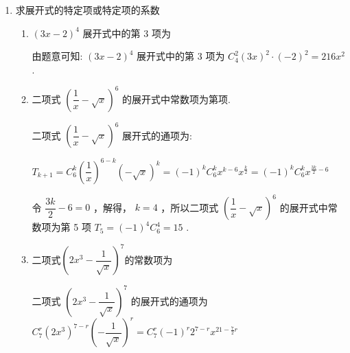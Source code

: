 \begin{enumerate}
\begin{enumerate}
\begin{jieda}
\begin{enumerate}
                令 $x = 1$ ,得 $n \cdot  {2}^{n - 1} = {{C}}_{n}^{1} + 2{{C}}_{n}^{2} + 3{C}_n^3 + 4{{C}}_{n}^{4} + \cdots  + n{{C}}_{n}^{n}$ ,
                
                取 $n = {2022}$ ，得 ${{C}}_{2022}^{1} + 2{{C}}_{2022}^{2} + 3{{C}}_{2022}^{3} + 4{{C}}_{2022}^{4} + \cdots  + {2022}{{C}}_{2022}^{2022} = {2022} \cdot  {2}^{2021} = {1011} \times  {2}^{2022}$.
            \end{enumerate}
        \end{jieda}

    \end{enumerate}
    
    \item 求展开式的特定项或特定项的系数
    \begin{enumerate}
        \item $(3x - 2)^4$ 展开式中的第 3 项为
        \begin{jieda}
            由题意可知: ${\left( 3x - 2\right) }^{4}$ 展开式中的第 3 项为 ${{C}}_{4}^{2}{\left( 3x\right) }^{2} \cdot  {\left( -2\right) }^{2} = {216}{x}^{2}$ .
        \end{jieda}
        
        \item 二项式 ${\left( \dfrac{1}{x} - \sqrt{x}\right) }^{6}$ 的展开式中常数项为第项.
        \begin{jieda}
            二项式 ${\left( \dfrac{1}{x} - \sqrt{x}\right) }^{6}$ 展开式的通项为:
            
            ${T}_{k + 1} = {{C}}_{6}^{k}{\left( \dfrac{1}{x}\right) }^{6 - k}{\left( -\sqrt{x}\right) }^{k} = {\left( -1\right) }^{k}{{C}}_{6}^{k}{x}^{k - 6}{x}^{\frac{k}{2}} = {\left( -1\right) }^{k}{{C}}_{6}^{k}{x}^{\frac{3k}{2} - 6}$
            
            令 $\dfrac{3k}{2} - 6 = 0$ ，解得， $k = 4$ ，所以二项式 ${\left( \dfrac{1}{x} - \sqrt{x}\right) }^{6}$ 的展开式中常数项为第 5 项 ${T}_{5} = {\left( -1\right) }^{4}{{C}}_{6}^{4} = {15}$ .
        \end{jieda}
        \item 二项式${\left( 2{x}^{3} - \dfrac{1}{\sqrt{x}}\right) }^{7}$的常数项为
        \begin{jieda}
            二项式 ${\left( 2{x}^{3} - \dfrac{1}{\sqrt{x}}\right) }^{7}$ 的展开式的通项为 ${{C}}_{7}^{r}{\left( 2{x}^{3}\right) }^{7 - r}{\left( -\dfrac{1}{\sqrt{x}}\right) }^{r} = {{C}}_{7}^{r}{\left( -1\right) }^{r}{2}^{7 - r}{x}^{{21} - \frac{7}{2}r}$ 
            

\end{jieda}
\end{enumerate}
\end{enumerate}
